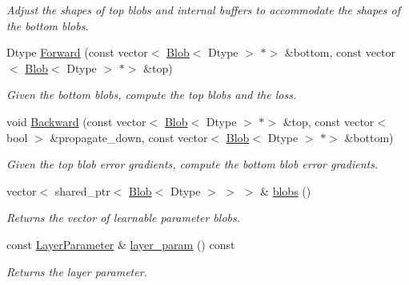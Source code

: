 \begin{DoxyCompactItemize}
\begin{DoxyCompactList}\small\item\em Adjust the shapes of top blobs and internal buffers to accommodate the shapes of the bottom blobs. \end{DoxyCompactList}\item 
Dtype \mbox{\hyperlink{classcaffe_1_1_layer_ab57d272dabe8c709d2a785eebe72ca57}{Forward}} (const vector$<$ \mbox{\hyperlink{classcaffe_1_1_blob}{Blob}}$<$ Dtype $>$ $\ast$$>$ \&bottom, const vector$<$ \mbox{\hyperlink{classcaffe_1_1_blob}{Blob}}$<$ Dtype $>$ $\ast$$>$ \&top)
\begin{DoxyCompactList}\small\item\em Given the bottom blobs, compute the top blobs and the loss. \end{DoxyCompactList}\item 
void \mbox{\hyperlink{classcaffe_1_1_layer_a183d343f5183a4762307f2c5e6ed1e12}{Backward}} (const vector$<$ \mbox{\hyperlink{classcaffe_1_1_blob}{Blob}}$<$ Dtype $>$ $\ast$$>$ \&top, const vector$<$ bool $>$ \&propagate\+\_\+down, const vector$<$ \mbox{\hyperlink{classcaffe_1_1_blob}{Blob}}$<$ Dtype $>$ $\ast$$>$ \&bottom)
\begin{DoxyCompactList}\small\item\em Given the top blob error gradients, compute the bottom blob error gradients. \end{DoxyCompactList}\item 
\mbox{\label{classcaffe_1_1_layer_aaf4524ce8641a30a8a4784aee1b2b4c8}} 
vector$<$ shared\+\_\+ptr$<$ \mbox{\hyperlink{classcaffe_1_1_blob}{Blob}}$<$ Dtype $>$ $>$ $>$ \& \mbox{\hyperlink{classcaffe_1_1_layer_aaf4524ce8641a30a8a4784aee1b2b4c8}{blobs}} ()
\begin{DoxyCompactList}\small\item\em Returns the vector of learnable parameter blobs. \end{DoxyCompactList}\item 
\mbox{\label{classcaffe_1_1_layer_adff82274f146e2b6922d0ebac2aaf215}} 
const \mbox{\hyperlink{classcaffe_1_1_layer_parameter}{Layer\+Parameter}} \& \mbox{\hyperlink{classcaffe_1_1_layer_adff82274f146e2b6922d0ebac2aaf215}{layer\+\_\+param}} () const
\begin{DoxyCompactList}\small\item\em Returns the layer parameter. \end{DoxyCompactList}\item 

\end{DoxyCompactItemize}
